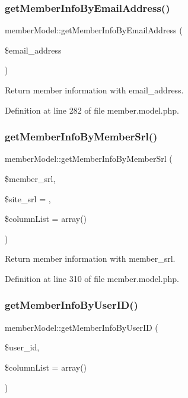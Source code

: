\subsubsection{\texorpdfstring{get\+Member\+Info\+By\+Email\+Address()}{getMemberInfoByEmailAddress()}}
{\footnotesize\ttfamily member\+Model\+::get\+Member\+Info\+By\+Email\+Address (\begin{DoxyParamCaption}\item[{}]{\$email\+\_\+address }\end{DoxyParamCaption})}



Return member information with email\+\_\+address. 



Definition at line 282 of file member.\+model.\+php.

\hypertarget{classmemberModel_a24b024c02da695d9a7b7bce7b3e84135}{}\label{classmemberModel_a24b024c02da695d9a7b7bce7b3e84135} 
\subsubsection{\texorpdfstring{get\+Member\+Info\+By\+Member\+Srl()}{getMemberInfoByMemberSrl()}}
{\footnotesize\ttfamily member\+Model\+::get\+Member\+Info\+By\+Member\+Srl (\begin{DoxyParamCaption}\item[{}]{\$member\+\_\+srl,  }\item[{}]{\$site\+\_\+srl = {},  }\item[{}]{\$column\+List = {\ttfamily array()} }\end{DoxyParamCaption})}



Return member information with member\+\_\+srl. 



Definition at line 310 of file member.\+model.\+php.

\hypertarget{classmemberModel_a51229368446fed60d67d3349a0ac305c}{}\label{classmemberModel_a51229368446fed60d67d3349a0ac305c} 
\subsubsection{\texorpdfstring{get\+Member\+Info\+By\+User\+I\+D()}{getMemberInfoByUserID()}}
{\footnotesize\ttfamily member\+Model\+::get\+Member\+Info\+By\+User\+ID (\begin{DoxyParamCaption}\item[{}]{\$user\+\_\+id,  }\item[{}]{\$column\+List = {\ttfamily array()} }\end{DoxyParamCaption})}



